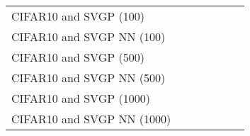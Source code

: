 \begin{tabular}{l C{0.6\tblw} C{0.6\tblw} C{0.6\tblw} C{0.6\tblw} C{0.6\tblw}  C{0.6\tblw}}
\sc CIFAR10 and SVGP (100) &  &  &  &  \\
\sc CIFAR10 and SVGP NN (100) &  &  &  &  \\
\sc CIFAR10 and SVGP (500) &  &  &  &  \\
\sc CIFAR10 and SVGP NN (500) &  &  &  &  \\
\sc CIFAR10 and SVGP (1000) &  &  &  &  \\
\sc CIFAR10 and SVGP NN (1000) &  &  &  &  \\
\bottomrule
\end{tabular}
